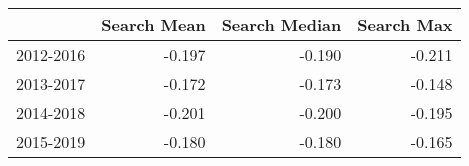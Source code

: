 \begin{table}[ht]
\centering
\begin{tabular}{rrrr}
  \hline
 & Search Mean & Search Median & Search Max \\ 
  \hline
2012-2016 & -0.197 & -0.190 & -0.211 \\ 
  2013-2017 & -0.172 & -0.173 & -0.148 \\ 
  2014-2018 & -0.201 & -0.200 & -0.195 \\ 
  2015-2019 & -0.180 & -0.180 & -0.165 \\ 
   \hline
\end{tabular}
\end{table}
